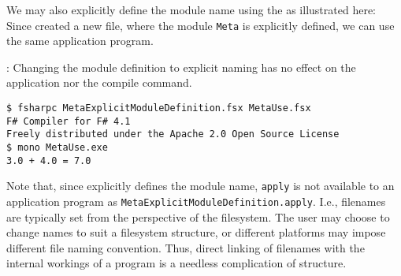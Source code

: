 We may also explicitly define the module name using the  as illustrated here:
%
%
Since created a new file, where the module \lstinline{Meta} is explicitly defined, we can use the same application program.
\begin{codeNOutput}{: Changing the module definition to explicit naming has no effect on the application nor the compile command.}
\begin{lstlisting}[language=console,escapechar=§]
$ fsharpc MetaExplicitModuleDefinition.fsx MetaUse.fsx
F# Compiler for F# 4.1
Freely distributed under the Apache 2.0 Open Source License
$ mono MetaUse.exe 
3.0 + 4.0 = 7.0
\end{lstlisting}
\end{codeNOutput}
Note that, since   explicitly defines the module name, \lstinline{apply} is not available to an application program as \lstinline{MetaExplicitModuleDefinition.apply}.  I.e., filenames are typically set from the perspective of the filesystem.  The user may choose to change names to suit a filesystem structure, or different platforms may impose different file naming convention. Thus, direct linking of filenames with the internal workings of a program is a needless complication of structure.

